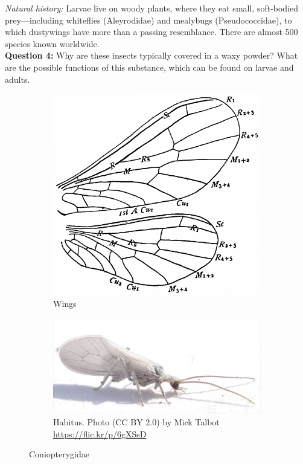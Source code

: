 \documentclass[letterpaper, 11pt]{article}
\begin{document}
\noindent{}\textit{Natural history:} Larvae live on woody plants, where they eat small, soft-bodied prey---including whiteflies (Aleyrodidae) and mealybugs (Pseudococcidae), to which dustywings have more than a passing resemblance. There are almost 500 species known worldwide. \\

\noindent{}\textbf{Question 4:} Why are these insects typically covered in a waxy powder? What are the possible functions of this substance, which can be found on larvae and adults. \\

\begin{figure}[ht!]
    \centering
    \begin{subfigure}[ht!]{0.34\textwidth}
        \includegraphics[width=\textwidth]{ConiopterygidWing}
        \caption{Wings \citep[][Fig. 211]{comstock1918wings}}
        \label{fig:coniopterygid1}
    \end{subfigure}
    \qquad
    \begin{subfigure}[ht!]{0.5\textwidth}
        \includegraphics[width=\textwidth]{ConiopterygidHabitus}
        \caption{Habitus. Photo (CC BY 2.0) by Mick Talbot \url{https://flic.kr/p/6gXSsD}}
        \label{fig:coniopterygid2}
    \end{subfigure}
    \caption{Coniopterygidae}\label{fig:coniopterygids}
\end{figure}
\end{document}
